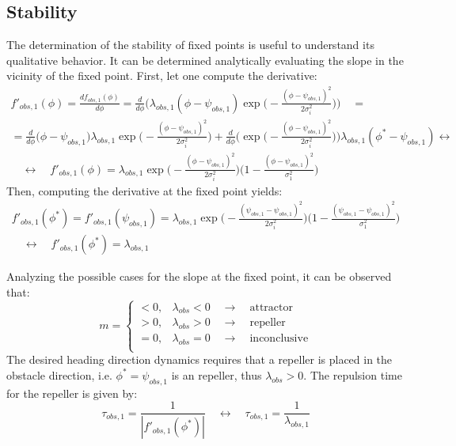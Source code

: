 \subsection{Stability}%
\label{sec:stability-obs}
The determination of the stability of fixed points is useful to understand its
qualitative behavior. It can be determined analytically evaluating the slope in
the vicinity of the fixed point. First, let one compute the derivative:
\begin{equation}
  \label{eq:30}
\begin{array}{ll}
  f'_{obs, 1}(\phi) = \frac{d f_{obs,1}(\phi)}{d \phi} = 
\frac{d}{d \phi} \Bigg( \lambda_{obs,1} (\phi -\psi_{obs,1}) \exp \Big(-\frac{(\phi - \psi_{obs,1})^2}{2 \sigma_i ^2} \Big) \Bigg)
\quad = \quad 
\\ 
= 
\frac{d}{d \phi} \Big(\phi -\psi_{obs,1}\Big) \lambda_{obs,1} \exp \Big(-\frac{(\phi - \psi_{obs,1})^2}{2 \sigma_i ^2} \Big) +
\frac{d}{d \phi} \Bigg( \exp \Big(-\frac{(\phi - \psi_{obs,1})^2}{2 \sigma_i ^2} \Big) \Bigg) \lambda_{obs,1} (\phi^* -\psi_{obs,1}) 
\leftrightarrow
\\ 
\quad \leftrightarrow \quad 
  f'_{obs, 1} (\phi) = \lambda_{obs,1} \exp \Big(-\frac{(\phi - \psi_{obs,1})^2} {2 \sigma_i ^2} \Big) \Big(1 - \frac{(\phi -\psi_{obs,1})^2}{\sigma_1 ^2} \Big) 
\end{array}
\end{equation}
Then, computing the derivative at the fixed point yields:
\begin{equation}
  \label{eq:31}
  \begin{array}{ll}
  f'_{obs, 1} (\phi^*) = f'_{obs, 1} (\psi_{obs,1}) =
  \lambda_{obs,1} \exp \Big(-\frac{(\psi_{obs,1} - \psi_{obs,1})^2} {2 \sigma_i ^2} \Big) \Big(1 - \frac{(\psi_{obs,1} -\psi_{obs,1})^2}{\sigma_1 ^2} \Big) 
\\
\quad \leftrightarrow \quad 
    \boxed{ f'_{obs, 1} (\phi^*) = \lambda_{obs,1}}
  \end{array}
\end{equation}

Analyzing the possible cases for the slope at the fixed point, it can be
observed that:
\begin{equation}
  \label{eq:22}
  m = \left\{
\begin{array}{ll}
      < 0 , & \lambda_{obs} < 0 \quad \rightarrow \quad \mathrm{attractor} \\
      > 0 , & \lambda_{obs} > 0 \quad \rightarrow \quad \mathrm{repeller} \\
      = 0 , & \lambda_{obs} = 0 \quad \rightarrow \quad \mathrm{inconclusive} \\
\end{array} 
\right. 
\end{equation}
The desired heading direction dynamics requires that a repeller is placed in
the obstacle direction, i.e. $\phi^* = \psi_{obs,1}$ is an repeller, thus
$\lambda_{obs} > 0$. The repulsion time for the repeller is given by:
\begin{equation}
  \label{eq:23}
 \tau_{obs,1} = \frac{1}{| f'_{obs,1}(\phi^*) |} \quad \leftrightarrow \quad \boxed{\tau_{obs,1} = \frac{1}{\lambda_{obs,1}}}
\end{equation}


